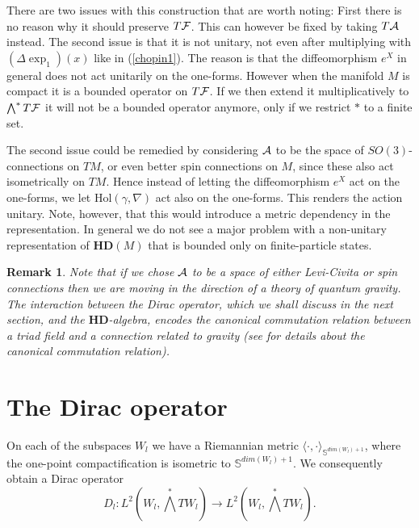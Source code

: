 \documentclass[letterpaper,11pt]{article}
\def\ca{{\cal A}}
\def\cf{{\cal F}}
\newtheorem{remark}{Remark}
\begin{document}
 There are two issues with this construction that are worth noting: First there is no reason why it should preserve $T\cf$. This can however be fixed by taking $T\ca$ instead.
  The second issue is that it is not unitary, not even after multiplying with $(\Delta \exp_1) (x)$ like in (\ref{chopin1}). The reason is that the diffeomorphism $e^X$ in general does not act unitarily on the one-forms. However when the manifold $M$ is compact it is a bounded operator on $T\cf$. If we then extend it multiplicatively to  $\bigwedge^* T\cf $ it will not be a bounded operator anymore, only if we restrict $*$ to a finite set.
  
  The second issue could be remedied by considering $\ca$ to be the space of $SO(3)$-connections on $TM$, or even better spin connections on $M$, since these also act isometrically on $TM$. Hence instead of letting the diffeomorphism $e^X$ act on the one-forms, we let $\mbox{Hol}(\gamma,\nabla)$ act also on the one-forms. This renders the action unitary. Note, however, that this would introduce a metric dependency in the representation. 
 In general we do not see a major problem with a non-unitary representation of $\mathbf{HD}(M)$ that is bounded only on finite-particle states.
  
  
  
  \begin{remark}
  Note that if we chose $\ca$ to be a space of either Levi-Civita or spin connections then we are moving in the direction of a theory of quantum gravity. The interaction between the Dirac operator, which we shall discuss in the next section, and the $\mathbf{HD}$-algebra, encodes the canonical commutation relation between a triad field and a connection related to gravity \cite{Ashtekar:1986yd,Ashtekar:1987gu} (see \cite{Aastrup:2015gba} for details about the canonical commutation relation).
  \end{remark}









\section{The Dirac operator}
\label{Diracoperator}

On each of the subspaces $W_l$ we have a Riemannian metric $\langle \cdot ,\cdot \rangle_{\mathbb{S}^{dim (W_l) +1}}$, where the one-point compactification is isometric to $\mathbb{S}^{dim (W_l) +1}$. We consequently obtain a Dirac operator 
$$D_l:L^2(W_l,\bigwedge^*TW_l) \to L^2(W_l,\bigwedge^*TW_l)  .$$
 
\end{document}
